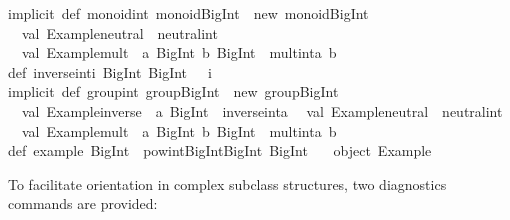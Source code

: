 \begin{isabellebody}
\begin{isamarkuptext}
{\isacharbraceright}\isanewline
\isanewline
implicit\ def\ monoid{\isacharunderscore}int{\isacharcolon}\ monoid{\isacharbrackleft}BigInt{\isacharbrackright}\ {\isacharequal}\ new\ monoid{\isacharbrackleft}BigInt{\isacharbrackright}\ {\isacharbraceleft}\isanewline
\ \ val\ {\isacharbackquote}Example{\isachardot}neutral{\isacharbackquote}\ {\isacharequal}\ neutral{\isacharunderscore}int\isanewline
\ \ val\ {\isacharbackquote}Example{\isachardot}mult{\isacharbackquote}\ {\isacharequal}\ {\isacharparenleft}a{\isacharcolon}\ BigInt{\isacharcomma}\ b{\isacharcolon}\ BigInt{\isacharparenright}\ {\isacharequal}{\isachargreater}\ mult{\isacharunderscore}int{\isacharparenleft}a{\isacharcomma}\ b{\isacharparenright}\isanewline
{\isacharbraceright}\isanewline
\isanewline
def\ inverse{\isacharunderscore}int{\isacharparenleft}i{\isacharcolon}\ BigInt{\isacharparenright}{\isacharcolon}\ BigInt\ {\isacharequal}\ {\isacharparenleft}{\isacharminus}\ i{\isacharparenright}\isanewline
\isanewline
implicit\ def\ group{\isacharunderscore}int{\isacharcolon}\ group{\isacharbrackleft}BigInt{\isacharbrackright}\ {\isacharequal}\ new\ group{\isacharbrackleft}BigInt{\isacharbrackright}\ {\isacharbraceleft}\isanewline
\ \ val\ {\isacharbackquote}Example{\isachardot}inverse{\isacharbackquote}\ {\isacharequal}\ {\isacharparenleft}a{\isacharcolon}\ BigInt{\isacharparenright}\ {\isacharequal}{\isachargreater}\ inverse{\isacharunderscore}int{\isacharparenleft}a{\isacharparenright}\isanewline
\ \ val\ {\isacharbackquote}Example{\isachardot}neutral{\isacharbackquote}\ {\isacharequal}\ neutral{\isacharunderscore}int\isanewline
\ \ val\ {\isacharbackquote}Example{\isachardot}mult{\isacharbackquote}\ {\isacharequal}\ {\isacharparenleft}a{\isacharcolon}\ BigInt{\isacharcomma}\ b{\isacharcolon}\ BigInt{\isacharparenright}\ {\isacharequal}{\isachargreater}\ mult{\isacharunderscore}int{\isacharparenleft}a{\isacharcomma}\ b{\isacharparenright}\isanewline
{\isacharbraceright}\isanewline
\isanewline
def\ example{\isacharcolon}\ BigInt\ {\isacharequal}\ pow{\isacharunderscore}int{\isacharbrackleft}BigInt{\isacharbrackright}{\isacharparenleft}BigInt{\isacharparenleft}{}{}{\isacharparenright}{\isacharcomma}\ BigInt{\isacharparenleft}{\isacharminus}\ {}{\isacharparenright}{\isacharparenright}\isanewline
\isanewline
{\isacharbraceright}\ {\isacharslash}{\isacharasterisk}\ object\ Example\ {\isacharasterisk}{\isacharslash}\isanewline%
\end{isamarkuptext}%
\isamarkuptrue%
%
\endisatagquotetypewriter
{\isafoldquotetypewriter}%
%
\isadelimquotetypewriter
%
\endisadelimquotetypewriter
%
\isamarkuptrue%
%
\begin{isamarkuptext}%
To facilitate orientation in complex subclass structures, two
  diagnostics commands are provided:


\end{isamarkuptext}
\end{isabellebody}
